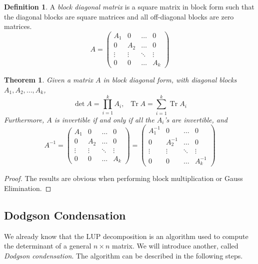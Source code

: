 \documentclass{article}
\DeclareMathOperator{\Tr}{Tr}
\newtheorem{theorem}{Theorem}[section]
\theoremstyle{remark}
\theoremstyle{definition}
\newtheorem{definition}{Definition}[section]
\begin{document}
    \begin{definition}
    A \textit{block diagonal matrix} is a square matrix in block form such that the diagonal blocks are square matrices and all off-diagonal blocks are zero matrices. 
    \[A = \begin{pmatrix}
    A_1&0&\ldots&0\\
    0&A_2&\ldots&0\\
    \vdots&\vdots&\ddots&\vdots\\
    0&0&\ldots&A_k
    \end{pmatrix}\]
    \end{definition}

    \begin{theorem}
    Given a matrix $A$ in block diagonal form, with diagonal blocks $A_1, A_2, ..., A_k$,
    \[\det{A} = \prod_{i=1}^k A_i, \; \; \Tr{A} = \sum_{i=1}^k \Tr{A_i}\]
    Furthermore, $A$ is invertible if and only if all the $A_i$'s are invertible, and 
    \[A^{-1} = \begin{pmatrix}
    A_1&0&\ldots&0\\
    0&A_2&\ldots&0\\
    \vdots&\vdots&\ddots&\vdots\\
    0&0&\ldots&A_k
    \end{pmatrix} = \begin{pmatrix}
    A_1^{-1}&0&\ldots&0\\
    0&A_2^{-1}&\ldots&0\\
    \vdots&\vdots&\ddots&\vdots\\
    0&0&\ldots&A_k^{-1}
    \end{pmatrix}\]
    \end{theorem}
    \begin{proof}
    The results are obvious when performing block multiplication or Gauss Elimination. 
    \end{proof}

  \subsection{Dodgson Condensation}

    We already know that the LUP decomposition is an algorithm used to compute the determinant of a general $n \times n$ matrix. We will introduce another, called \textit{Dodgson condensation}. The algorithm can be described in the following steps.
\end{document}
